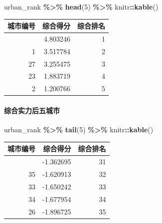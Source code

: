 \documentclass[
]{article}
\newenvironment{Shaded}{\begin{snugshade}}{\end{snugshade}}
\newcommand{\DecValTok}[1]{\textcolor[rgb]{0.00,0.00,0.81}{#1}}
\newcommand{\FunctionTok}[1]{\textcolor[rgb]{0.13,0.29,0.53}{\textbf{#1}}}
\newcommand{\NormalTok}[1]{#1}
\newcommand{\SpecialCharTok}[1]{\textcolor[rgb]{0.81,0.36,0.00}{\textbf{#1}}}
\begin{document}
\begin{Shaded}
\begin{Highlighting}[]
\NormalTok{urban\_rank }\SpecialCharTok{\%\textgreater{}\%} 
  \FunctionTok{head}\NormalTok{(}\DecValTok{5}\NormalTok{) }\SpecialCharTok{\%\textgreater{}\%} 
\NormalTok{  knitr}\SpecialCharTok{::}\FunctionTok{kable}\NormalTok{()}
\end{Highlighting}
\end{Shaded}

\begin{longtable}[]{@{}rrr@{}}
\toprule\noalign{}
城市编号 & 综合得分 & 综合排名 \\
\midrule\noalign{}
\endhead
\bottomrule\noalign{}
\endlastfoot
10 & 4.803246 & 1 \\
1 & 3.517784 & 2 \\
27 & 3.255475 & 3 \\
23 & 1.883719 & 4 \\
2 & 1.200766 & 5 \\
\end{longtable}

\paragraph{综合实力后五城市}\label{ux7efcux5408ux5b9eux529bux540eux4e94ux57ceux5e02}

\begin{Shaded}
\begin{Highlighting}[]
\NormalTok{urban\_rank }\SpecialCharTok{\%\textgreater{}\%} 
  \FunctionTok{tail}\NormalTok{(}\DecValTok{5}\NormalTok{) }\SpecialCharTok{\%\textgreater{}\%} 
\NormalTok{  knitr}\SpecialCharTok{::}\FunctionTok{kable}\NormalTok{()}
\end{Highlighting}
\end{Shaded}

\begin{longtable}[]{@{}rrr@{}}
\toprule\noalign{}
城市编号 & 综合得分 & 综合排名 \\
\midrule\noalign{}
\endhead
\bottomrule\noalign{}
\endlastfoot
5 & -1.362695 & 31 \\
35 & -1.620913 & 32 \\
33 & -1.650242 & 33 \\
34 & -1.677954 & 34 \\
26 & -1.896725 & 35 \\
\end{longtable}
\end{document}
